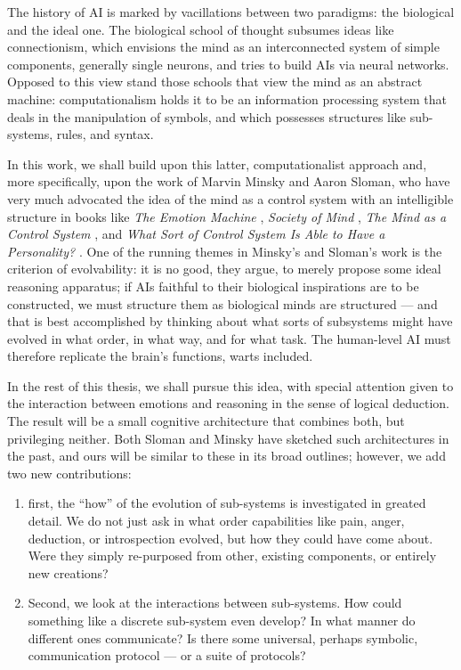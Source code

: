 The history of AI is marked by vacillations between two paradigms: the biological and the ideal one. The biological school of thought subsumes ideas like connectionism, which envisions the mind as an interconnected system of simple components, generally single neurons, and tries to build AIs via neural networks. Opposed to this view stand those schools that view the mind as an abstract machine: computationalism holds it to be an information processing system that deals in the manipulation of symbols, and which possesses structures like sub-systems, rules, and syntax.

In this work, we shall build upon this latter, computationalist approach and, more specifically, upon the work of Marvin Minsky and Aaron Sloman, who have very much advocated the idea of the mind as a control system with an intelligible structure in books like {\em The Emotion Machine} \cite{emotionMachine}, {\em Society of Mind} \cite{societyOfMind}, {\em The Mind as a Control System} \cite{sloman1993}, and {\em What Sort of Control System Is Able to Have a Personality?} \cite{sloman1997}. One of the running themes in Minsky's and Sloman's work is the criterion of evolvability: it is no good, they argue, to merely propose some ideal reasoning apparatus; if AIs faithful to their biological inspirations are to be constructed, we must structure them as biological minds are structured --- and that is best accomplished by thinking about what sorts of subsystems might have evolved in what order, in what way, and for what task. The human-level AI must therefore replicate the brain's functions, warts included.

In the rest of this thesis, we shall pursue this idea, with special attention given to the interaction between emotions and reasoning in the sense of logical deduction. The result will be a small cognitive architecture that combines both, but privileging neither. Both Sloman and Minsky have sketched such architectures in the past, and ours will be similar to these in its broad outlines; however, we add two new contributions:

\begin{enumerate}
	\item first, the ``how'' of the evolution of sub-systems is investigated in greated detail. We do not just ask in what order capabilities like pain, anger, deduction, or introspection evolved, but how they could have come about. Were they simply re-purposed from other, existing components, or entirely new creations?
	\item Second, we look at the interactions between sub-systems. How could something like a discrete sub-system even develop? In what manner do different ones communicate? Is there some universal, perhaps symbolic, communication protocol --- or a suite of protocols?
\end{enumerate} 

